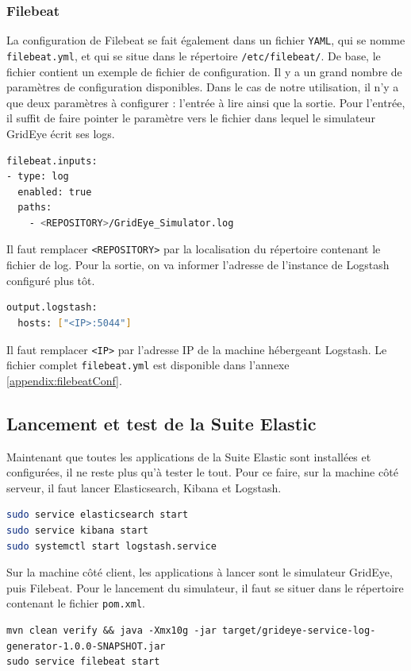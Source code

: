\documentclass[paper=a4, fontsize=11pt]{scrartcl}
\begin{document}
\subsubsection{Filebeat}
La configuration de Filebeat se fait également dans un fichier \verb,YAML,, qui se nomme \verb,filebeat.yml,, et qui se situe dans le répertoire \verb,/etc/filebeat/,. De base, le fichier contient un exemple de fichier de configuration. Il y a un grand nombre de paramètres de configuration disponibles. Dans le cas de notre utilisation, il n'y a que deux paramètres à configurer : l'entrée à lire ainsi que la sortie.
Pour l'entrée, il suffit de faire pointer le paramètre vers le fichier dans lequel le simulateur GridEye écrit ses logs.
\begin{lstlisting}[language=bash]
filebeat.inputs:
- type: log
  enabled: true
  paths:
    - <REPOSITORY>/GridEye_Simulator.log
\end{lstlisting}
Il faut remplacer \verb,<REPOSITORY>, par la localisation du répertoire contenant le fichier de log.
Pour la sortie, on va informer l'adresse de l'instance de Logstash configuré plus tôt.
\begin{lstlisting}[language=bash]
output.logstash:
  hosts: ["<IP>:5044"]
\end{lstlisting}
Il faut remplacer \verb,<IP>, par l'adresse IP de la machine hébergeant Logstash.
Le fichier complet \verb,filebeat.yml, est disponible dans l'annexe \ref{appendix:filebeatConf}.

\subsection{Lancement et test de la Suite Elastic} \label{ss-lancementTestsElastic}
Maintenant que toutes les applications de la Suite Elastic sont installées et configurées, il ne reste plus qu'à tester le tout. Pour ce faire, sur la machine côté serveur, il faut lancer Elasticsearch, Kibana et Logstash.
\begin{lstlisting}[language=bash]
sudo service elasticsearch start
sudo service kibana start
sudo systemctl start logstash.service
\end{lstlisting}

Sur la machine côté client, les applications à lancer sont le simulateur GridEye, puis Filebeat. Pour le lancement du simulateur, il faut se situer dans le répertoire contenant le fichier \verb,pom.xml,.
\begin{lstlisting}
mvn clean verify && java -Xmx10g -jar target/grideye-service-log-generator-1.0.0-SNAPSHOT.jar
sudo service filebeat start
\end{lstlisting}
\end{document}

